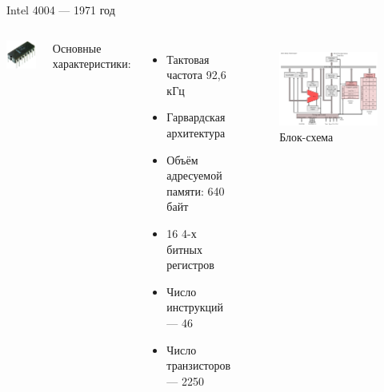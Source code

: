 \documentclass{beamer}
\begin{document}
    \begin{frame}{Intel 4004 --- 1971 год}
    \begin{columns}
    	\includegraphics[width=0.7\linewidth]{fig/Intel_4004.jpg}
    	\footnotesize

    	Основные характеристики:
    	\begin{itemize}
    		\item Тактовая частота 92,6 кГц
    		\item Гарвардская архитектура
    		\item Объём адресуемой памяти: 640 байт
    		\item 16 4-х битных регистров
    		\item Число инструкций --- 46
    		\item Число транзисторов --- 2250 
    	\end{itemize}
    	\begin{figure}
    		\includegraphics[width=\linewidth]{fig/4004_arch.png} \\
    		Блок-схема
    	\end{figure}
    \end{columns}
    \end{frame}
\end{document}
